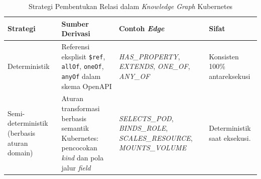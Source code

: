 ﻿\renewcommand{\arraystretch}{1.3}
\captionsetup[table]{justification=raggedright,singlelinecheck=false}
\begin{table}[H]
\caption{Strategi Pembentukan Relasi dalam \textit{Knowledge Graph} Kubernetes}
\label{tbl:strategi_relasi}
\centering
\begin{tabular}{|p{}|p{}|p{}|p{}|}
\hline
\textbf{Strategi} & \textbf{Sumber Derivasi} & \textbf{Contoh \textit{Edge}} & \textbf{Sifat} \\
\hline
Deterministik &
Referensi eksplisit \texttt{\$ref}, \texttt{allOf}, \texttt{oneOf}, \texttt{anyOf} dalam skema OpenAPI &
\textit{HAS\_PROPERTY}, \textit{EXTENDS}, \textit{ONE\_OF}, \textit{ANY\_OF} &
Konsisten 100\% antareksekusi \\
\hline
Semi-deterministik (berbasis aturan domain) &
Aturan transformasi berbasis semantik Kubernetes: pencocokan \textit{kind} dan pola jalur \textit{field} &
\textit{SELECTS\_POD}, \textit{BINDS\_ROLE}, \textit{SCALES\_RESOURCE}, \textit{MOUNTS\_VOLUME} &
Deterministik saat eksekusi. \\
\hline
\end{tabular}
\end{table}
